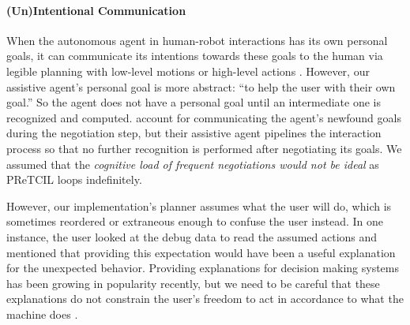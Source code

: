 \documentclass[letterpaper]{article} %
\begin{document}


\vspace{-12pt}
\paragraph{(Un)Intentional Communication} When the autonomous agent in human-robot interactions has its own personal goals, it can communicate its intentions towards these goals to the human via legible planning with low-level motions \cite{Dragan-2013-7732} or high-level actions \cite{DBLP:conf/aaai/KulkarniSK19}.  However, our assistive agent's personal goal is more abstract: ``to help the user with their own goal.''  So the agent does not have a personal goal until an intermediate one is recognized and computed.  \citeauthor{geibPetrick_2016}  account for communicating the agent's newfound goals during the negotiation step, but their assistive agent pipelines the interaction process so that no further recognition is performed after negotiating its goals. %
 We assumed that the \textit{cognitive load of frequent negotiations would not be ideal} as {\sc PReTCIL} loops indefinitely.

However, our implementation's planner assumes what the user will do, which is sometimes reordered or extraneous enough to confuse the user instead.  In one instance, the user looked at the debug data to read the assumed actions and mentioned that providing this expectation would have been a useful explanation for the unexpected behavior.  Providing explanations for decision making systems \cite{xaip} has been growing in popularity recently, but we need to be careful that these explanations do not constrain the user's freedom to act in accordance to what the machine does \cite{DBLP:conf/aaaifs/CastroRMB17}.
\end{document}
